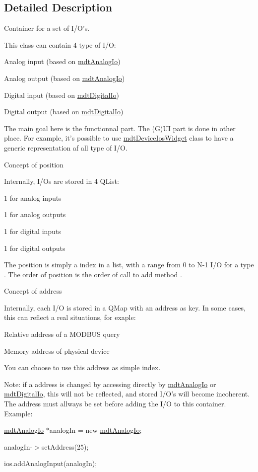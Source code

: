 \subsection{Detailed Description}
Container for a set of I/\-O's. 

This class can contain 4 type of I/\-O\-:
\begin{DoxyItemize}
\item Analog input (based on \hyperlink{classmdt_analog_io}{mdt\-Analog\-Io})
\item Analog output (based on \hyperlink{classmdt_analog_io}{mdt\-Analog\-Io})
\item Digital input (based on \hyperlink{classmdt_digital_io}{mdt\-Digital\-Io})
\item Digital output (based on \hyperlink{classmdt_digital_io}{mdt\-Digital\-Io})
\end{DoxyItemize}

The main goal here is the functionnal part. The (G)U\-I part is done in other place. For example, it's possible to use \hyperlink{classmdt_device_ios_widget}{mdt\-Device\-Ios\-Widget} class to have a generic representation af all type of I/\-O.

Concept of position

Internally, I/\-Os are stored in 4 Q\-List\-:
\begin{DoxyItemize}
\item 1 for analog inputs
\item 1 for analog outputs
\item 1 for digital inputs
\item 1 for digital outputs
\end{DoxyItemize}

The position is simply a index in a list, with a range from 0 to N-\/1 I/\-O for a type . The order of position is the order of call to add method .

Concept of address

Internally, each I/\-O is stored in a Q\-Map with an address as key. In some cases, this can reflect a real situations, for exaple\-:
\begin{DoxyItemize}
\item Relative address of a M\-O\-D\-B\-U\-S query
\item Memory address of physical device
\end{DoxyItemize}

You can choose to use this address as simple index.

Note\-: if a address is changed by accessing directly by \hyperlink{classmdt_analog_io}{mdt\-Analog\-Io} or \hyperlink{classmdt_digital_io}{mdt\-Digital\-Io}, this will not be reflected, and stored I/\-O's will become incoherent. The address must allways be set before adding the I/\-O to this container. Example\-:
\begin{DoxyItemize}
\item \hyperlink{classmdt_analog_io}{mdt\-Analog\-Io} $\ast$analog\-In = new \hyperlink{classmdt_analog_io}{mdt\-Analog\-Io};
\item analog\-In-\/$>$set\-Address(25);
\item ios.\-add\-Analog\-Input(analog\-In);
\end{DoxyItemize}


